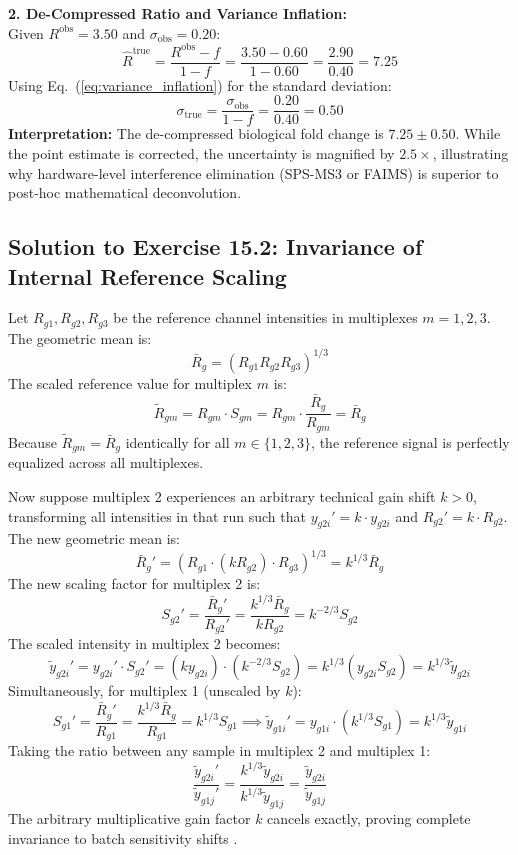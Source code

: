 \documentclass[11pt,oneside]{book}
\begin{document}
\textbf{2. De-Compressed Ratio and Variance Inflation:}\\
Given $R^{\text{obs}} = 3.50$ and $\sigma_{\text{obs}} = 0.20$:
\begin{equation*}
\hat{R}^{\text{true}} = \frac{R^{\text{obs}} - f}{1 - f} = \frac{3.50 - 0.60}{1 - 0.60} = \frac{2.90}{0.40} = 7.25
\end{equation*}
Using Eq.~(\ref{eq:variance_inflation}) for the standard deviation:
\begin{equation*}
\sigma_{\text{true}} = \frac{\sigma_{\text{obs}}}{1 - f} = \frac{0.20}{0.40} = 0.50
\end{equation*}
\textbf{Interpretation:} The de-compressed biological fold change is $7.25 \pm 0.50$. While the point estimate is corrected, the uncertainty is magnified by $2.5\times$, illustrating why hardware-level interference elimination (SPS-MS3 or FAIMS) is superior to post-hoc mathematical deconvolution.

\subsection*{Solution to Exercise 15.2: Invariance of Internal Reference Scaling}
Let $R_{g1}, R_{g2}, R_{g3}$ be the reference channel intensities in multiplexes $m = 1, 2, 3$. The geometric mean is:
$$\bar{R}_g = \left( R_{g1} R_{g2} R_{g3} \right)^{1/3}$$
The scaled reference value for multiplex $m$ is:
$$\tilde{R}_{gm} = R_{gm} \cdot S_{gm} = R_{gm} \cdot \frac{\bar{R}_g}{R_{gm}} = \bar{R}_g$$
Because $\tilde{R}_{gm} = \bar{R}_g$ identically for all $m \in \{1, 2, 3\}$, the reference signal is perfectly equalized across all multiplexes.

Now suppose multiplex 2 experiences an arbitrary technical gain shift $k > 0$, transforming all intensities in that run such that $y_{g2i}' = k \cdot y_{g2i}$ and $R_{g2}' = k \cdot R_{g2}$. The new geometric mean is:
$$\bar{R}_g' = \left( R_{g1} \cdot (k R_{g2}) \cdot R_{g3} \right)^{1/3} = k^{1/3} \bar{R}_g$$
The new scaling factor for multiplex 2 is:
$$S_{g2}' = \frac{\bar{R}_g'}{R_{g2}'} = \frac{k^{1/3} \bar{R}_g}{k R_{g2}} = k^{-2/3} S_{g2}$$
The scaled intensity in multiplex 2 becomes:
$$\tilde{y}_{g2i}' = y_{g2i}' \cdot S_{g2}' = (k y_{g2i}) \cdot (k^{-2/3} S_{g2}) = k^{1/3} \left( y_{g2i} S_{g2} \right) = k^{1/3} \tilde{y}_{g2i}$$
Simultaneously, for multiplex 1 (unscaled by $k$):
$$S_{g1}' = \frac{\bar{R}_g'}{R_{g1}} = \frac{k^{1/3} \bar{R}_g}{R_{g1}} = k^{1/3} S_{g1} \implies \tilde{y}_{g1i}' = y_{g1i} \cdot (k^{1/3} S_{g1}) = k^{1/3} \tilde{y}_{g1i}$$
Taking the ratio between any sample in multiplex 2 and multiplex 1:
$$\frac{\tilde{y}_{g2i}'}{\tilde{y}_{g1j}'} = \frac{k^{1/3} \tilde{y}_{g2i}}{k^{1/3} \tilde{y}_{g1j}} = \frac{\tilde{y}_{g2i}}{\tilde{y}_{g1j}}$$
The arbitrary multiplicative gain factor $k$ cancels exactly, proving complete invariance to batch sensitivity shifts \cite{plubell2017extended}.
\end{document}
